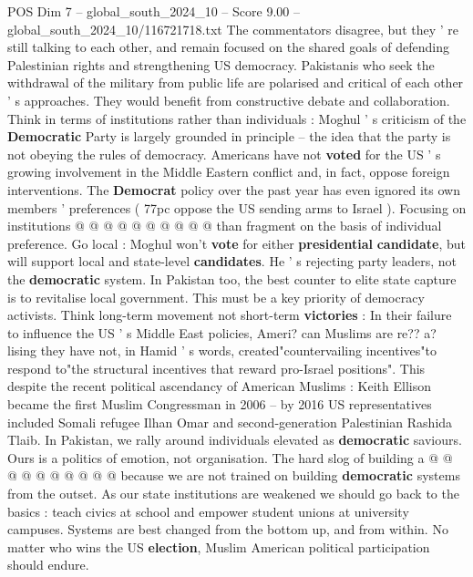 \begin{textsample}{POS Dim 7 – global\_south\_2024\_10 – Score 9.00 – global\_south\_2024\_10/116721718.txt}
The commentators disagree, but they ' re still talking to each other, and remain focused on the shared goals of defending Palestinian rights and strengthening US democracy.
Pakistanis who seek the withdrawal of the military from public life are polarised and critical of each other ' s approaches.
They would benefit from constructive debate and collaboration.
Think in terms of institutions rather than individuals : Moghul ' s criticism of the \textbf{Democratic} Party is largely grounded in principle -- the idea that the party is not obeying the rules of democracy.
Americans have not \textbf{voted} for the US ' s growing involvement in the Middle Eastern conflict and, in fact, oppose foreign interventions.
The \textbf{Democrat} policy over the past year has even ignored its own members ' preferences ( 77pc oppose the US sending arms to Israel ).
Focusing on institutions @ @ @ @ @ @ @ @ @ @ than fragment on the basis of individual preference.
Go local : Moghul won't \textbf{vote} for either \textbf{presidential} \textbf{candidate}, but will support local and state-level \textbf{candidates}.
He ' s rejecting party leaders, not the \textbf{democratic} system.
In Pakistan too, the best counter to elite state capture is to revitalise local government.
This must be a key priority of democracy activists.
Think long-term movement not short-term \textbf{victories} : In their failure to influence the US ' s Middle East policies, Ameri? can Muslims are re?? a? lising they have not, in Hamid ' s words, created"countervailing incentives"to respond to"the structural incentives that reward pro-Israel positions".
This despite the recent political ascendancy of American Muslims : Keith Ellison became the first Muslim Congressman in 2006 -- by 2016 US representatives included Somali refugee Ilhan Omar and second-generation Palestinian Rashida Tlaib.
In Pakistan, we rally around individuals elevated as \textbf{democratic} saviours.
Ours is a politics of emotion, not organisation.
The hard slog of building a @ @ @ @ @ @ @ @ @ @ because we are not trained on building \textbf{democratic} systems from the outset.
As our state institutions are weakened we should go back to the basics : teach civics at school and empower student unions at university campuses.
Systems are best changed from the bottom up, and from within.
No matter who wins the US \textbf{election}, Muslim American political participation should endure.

\end{textsample}
